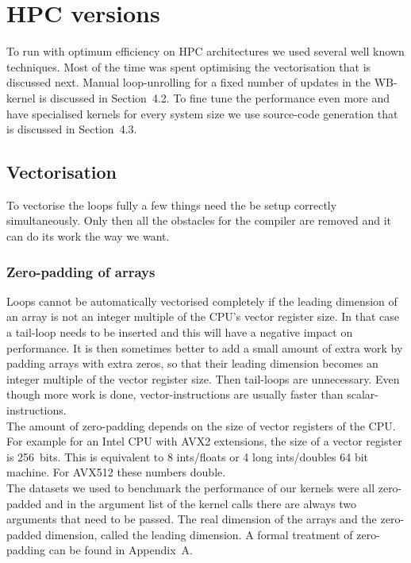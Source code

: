 \documentclass[11pt]{article}
\numberwithin{figure}{section}
\numberwithin{table}{section}
\begin{document}
  \section{HPC versions}
    To run with optimum efficiency on HPC architectures we used several well known techniques. Most of the time was spent optimising the vectorisation that is discussed next. Manual loop-unrolling for a fixed number of updates in the WB-kernel is discussed in Section~4.2. To fine tune the performance even more and have specialised kernels for every system size we use source-code generation that is discussed in Section~4.3.

    \subsection{Vectorisation}
        To vectorise the loops fully a few things need the be setup correctly simultaneously. Only then all the obstacles for the compiler are removed and it can do its work the way we want.
      \subsubsection{Zero-padding of arrays}
      Loops cannot be automatically vectorised completely if the leading dimension of an array is not an integer multiple of the CPU's vector register size. In that case a tail-loop needs to be inserted and this will have a negative impact on performance. It is then sometimes better to add a small amount of extra work by padding arrays with extra zeros, so that their leading dimension becomes an integer multiple of the vector register size. Then tail-loops are unnecessary. Even though more work is done, vector-instructions are usually faster than scalar-instructions.\\
				
      The amount of zero-padding depends on the size of vector registers of the CPU. For example for an Intel CPU with AVX2 extensions, the size of a vector register is 256~bits. This is equivalent to 8 ints/floats or 4 long ints/doubles 64 bit machine. For AVX512 these numbers double.\\
      
      The datasets we used to benchmark the performance of our kernels were all zero-padded and in the argument list of the kernel calls there are always two arguments that need to be passed. The real dimension of the arrays and the zero-padded dimension, called the leading dimension. A formal treatment of zero-padding can be found in Appendix~A.
\end{document}
